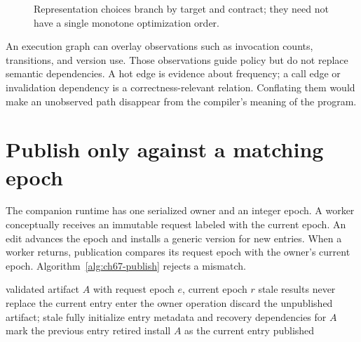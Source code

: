 \begin{figure}[htbp]
\centering
{}
\caption{Representation choices branch by target and contract; they need not have a single monotone optimization order.}
\label{fig:ch67-artifacts}
\end{figure}

An execution graph can overlay observations such as invocation counts, transitions, and version use.
Those observations guide policy but do not replace semantic dependencies.
A hot edge is evidence about frequency; a call edge or invalidation dependency is a correctness-relevant relation.
Conflating them would make an unobserved path disappear from the compiler's meaning of the program.

\section{Publish only against a matching epoch}
\label{sec:ch67-publication}

The companion runtime has one serialized owner and an integer epoch.
A worker conceptually receives an immutable request labeled with the current epoch.
An edit advances the epoch and installs a generic version for new entries.
When a worker returns, publication compares its request epoch with the owner's current epoch.
Algorithm~\ref{alg:ch67-publish} rejects a mismatch.

\begin{algorithm}[htbp]
\caption{Publish a completed version through one serialized owner.}
\label{alg:ch67-publish}
\begin{pseudocode}
\Require validated artifact $A$ with request epoch $e$, current epoch $r$
\Ensure stale results never replace the current entry
\State enter the owner operation
  \State discard the unpublished artifact; \Return stale
\EndIf
\State fully initialize entry metadata and recovery dependencies for $A$
\State mark the previous entry retired
\State install $A$ as the current entry
\State \Return published
\end{pseudocode}
\end{algorithm}

